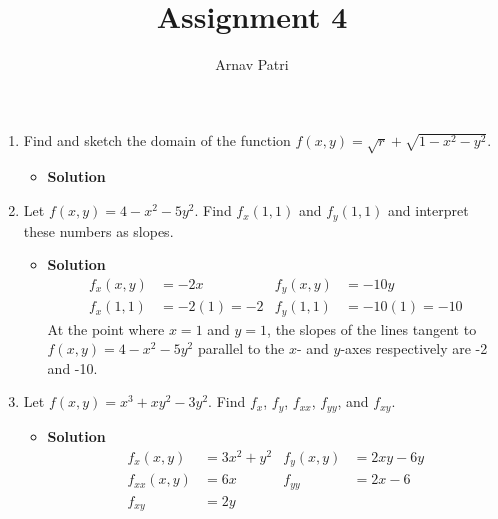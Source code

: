 \documentclass[12pt, A4]{article}
\title{Assignment 4}
\author{Arnav Patri}
\begin{document}
	\maketitle
		\begin{enumerate}[1)]
			\item
				Find and sketch the domain of the function $f(x, y) = \sqrt{r} + \sqrt{1 - x^2 - y^2}$.
				\begin{itemize}
					\item[] \textbf{Solution}
				\end{itemize}
			\item
				Let $f(x, y) = 4 - x^2 - 5y^2$. Find $f_x(1, 1)$ and $f_y(1, 1)$ and interpret these numbers as slopes.
				\begin{itemize}
					\item[] \textbf{Solution}
						\begin{align*}
							f_x(x, y) &= -2x &
									f_y(x, y) &= -10y \\
							f_x(1, 1) &= -2(1) = -2 &
									f_y(1, 1) &= -10(1) = -10
						\end{align*}
						At the point where $x = 1$ and $y = 1$, the slopes of the lines tangent to $f(x, y) = 4 - x^2 - 5y^2$ parallel to the $x$- and $y$-axes respectively are -2 and -10.
				\end{itemize}

			\item
				Let $f(x, y) = x^3 + xy^2 - 3y^2$. Find $f_x$, $f_y$, $f_{xx}$, $f_{yy}$, and $f_{xy}$.
				\begin{itemize}
					\item[] \textbf{Solution}
						\begin{align*}
							f_x(x, y) &= 3x ^2 + y^2 &
									f_y(x, y) &= 2xy - 6y \\
							f_{xx}(x, y) &= 6x &
									f_{yy} &= 2x - 6 \\
							f_{xy} &= 2y
						\end{align*}
				\end{itemize}
		\end{enumerate}
\end{document}
